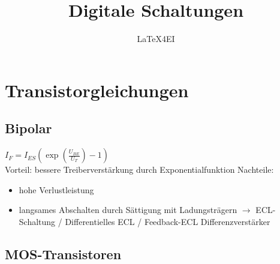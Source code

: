\documentclass[english]{latex4ei/latex4ei_sheet}
\title{Digitale Schaltungen}
\author{LaTeX4EI}                    %
\begin{document}
\ifdefined\GitRevision{}\fi

\maketitle   %


\section{Transistorgleichungen}

\subsection{Bipolar}
$I_F = I_{ES}\left(\exp\left(\frac{U_{BE}}{U_T}\right)-1\right)$\\
Vorteil: bessere Treiberverstärkung durch Exponentialfunktion
Nachteile:\begin{itemize}
	\item hohe Verlustleistung
	\item langsames Abschalten durch Sättigung mit Ladungsträgern $\rightarrow$ ECL-Schaltung / Differentielles ECL / Feedback-ECL Differenzverstärker
\end{itemize}

\subsection{MOS-Transistoren}
 
\end{document}
